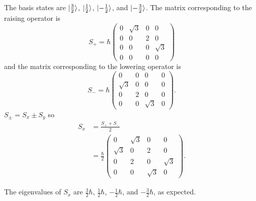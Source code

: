 \documentclass{article}
\begin{document}
\setcounter{subsection}{60}
\subsection{}

The basis states are $\ket{\frac{3}{2}}$, $\ket{\frac{1}{2}}$, $\ket{-\frac{1}{2}}$, and $\ket{-\frac{3}{2}}$. The matrix corresponding to the raising operator is \[S_+ = \hbar \begin{pmatrix}
    0 & \sqrt{3} & 0 & 0        \\
    0 & 0        & 2 & 0        \\
    0 & 0        & 0 & \sqrt{3} \\
    0 & 0        & 0 & 0
  \end{pmatrix}\] and the matrix corresponding to the lowering operator is \[S_- = \hbar \begin{pmatrix}
    0        & 0 & 0        & 0 \\
    \sqrt{3} & 0 & 0        & 0 \\
    0        & 2 & 0        & 0 \\
    0        & 0 & \sqrt{3} & 0
  \end{pmatrix}.\] $S_\pm = S_x \pm S_y$ so \begin{align*}
  S_x & = \frac{S_+ + S_-}{2}                                       \\
      & = \frac{\hbar}{2} \begin{pmatrix}
                            0        & \sqrt{3} & 0        & 0        \\
                            \sqrt{3} & 0        & 2        & 0        \\
                            0        & 2        & 0        & \sqrt{3} \\
                            0        & 0        & \sqrt{3} & 0
                          \end{pmatrix}.
\end{align*}

The eigenvalues of $S_x$ are $\frac{3}{2} \hbar$, $\frac{1}{2} \hbar$, $-\frac{1}{2} \hbar$, and $-\frac{3}{2} \hbar$, as expected.

\setcounter{subsection}{63}
\subsection{}
\end{document}
